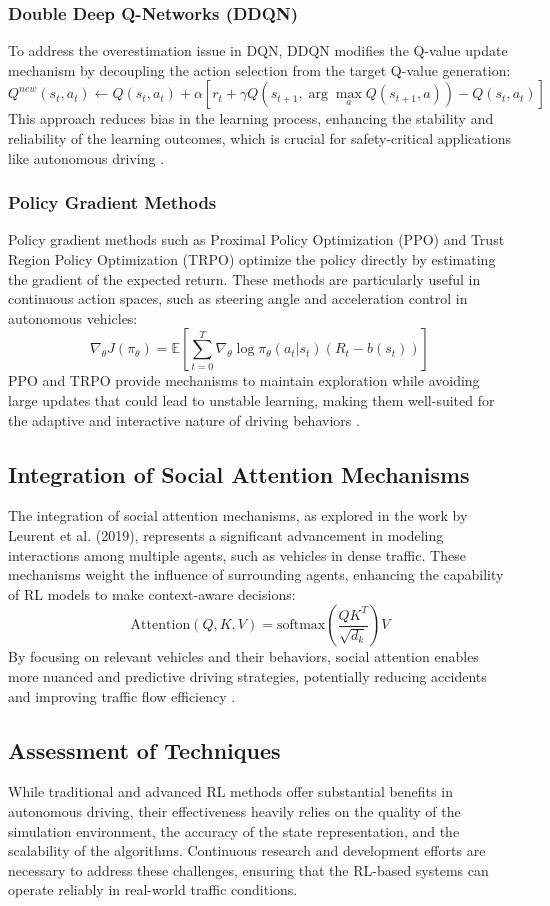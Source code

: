 \documentclass{article}
\begin{document}
\subsubsection{Double Deep Q-Networks (DDQN)}
To address the overestimation issue in DQN, DDQN modifies the Q-value update mechanism by decoupling the action selection from the target Q-value generation:
\[
Q^{new}(s_t, a_t) \leftarrow Q(s_t, a_t) + \alpha \left[r_t + \gamma Q(s_{t+1}, \arg\max_{a}Q(s_{t+1}, a)) - Q(s_t, a_t)\right]
\]
This approach reduces bias in the learning process, enhancing the stability and reliability of the learning outcomes, which is crucial for safety-critical applications like autonomous driving \cite{8500630}.

\subsubsection{Policy Gradient Methods}
Policy gradient methods such as Proximal Policy Optimization (PPO) and Trust Region Policy Optimization (TRPO) optimize the policy directly by estimating the gradient of the expected return. These methods are particularly useful in continuous action spaces, such as steering angle and acceleration control in autonomous vehicles:
\[
\nabla_{\theta} J(\pi_{\theta}) = \mathbb{E}\left[\sum_{t=0}^{T} \nabla_{\theta} \log \pi_{\theta}(a_t|s_t) (R_t - b(s_t))\right]
\]
PPO and TRPO provide mechanisms to maintain exploration while avoiding large updates that could lead to unstable learning, making them well-suited for the adaptive and interactive nature of driving behaviors \cite{7339478}.

\subsection{Integration of Social Attention Mechanisms}
The integration of social attention mechanisms, as explored in the work by Leurent et al. (2019), represents a significant advancement in modeling interactions among multiple agents, such as vehicles in dense traffic. These mechanisms weight the influence of surrounding agents, enhancing the capability of RL models to make context-aware decisions:
\[
\mathrm{Attention}(Q, K, V) = \mathrm{softmax}\left(\frac{QK^T}{\sqrt{d_k}}\right) V
\]
By focusing on relevant vehicles and their behaviors, social attention enables more nuanced and predictive driving strategies, potentially reducing accidents and improving traffic flow efficiency \cite{leurent2019social}.

\subsection{Assessment of Techniques}
While traditional and advanced RL methods offer substantial benefits in autonomous driving, their effectiveness heavily relies on the quality of the simulation environment, the accuracy of the state representation, and the scalability of the algorithms. Continuous research and development efforts are necessary to address these challenges, ensuring that the RL-based systems can operate reliably in real-world traffic conditions.
\end{document}
